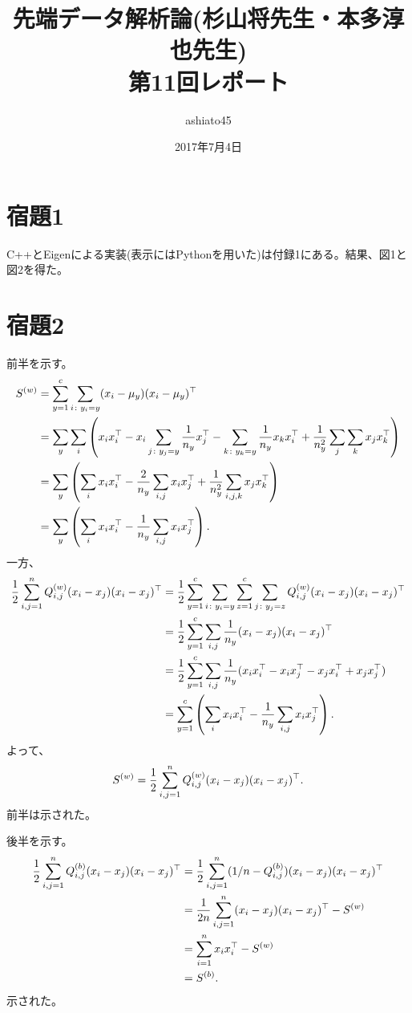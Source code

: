 \documentclass[9pt]{ltjsarticle}
\title{先端データ解析論(杉山将先生・本多淳也先生)\\第11回レポート}
\author{ashiato45}
\date{2017年7月4日}
\begin{document}
\maketitle

\section*{宿題1}
C++とEigenによる実装(表示にはPythonを用いた)は付録1にある。結果、図1と図2を得た。

\section*{宿題2}
前半を示す。
\begin{align}
S^{(w)} 
&=
\sum_{y=1}^c \sum_{i\colon y_i = y} (x_i - \mu_y)(x_i-\mu_y)^\top\\
&=
\sum_y \sum_i \left(x_ix_i^\top - x_i \sum_{j\colon y_j=y}\frac{1}{n_y}x_j^\top - \sum_{k\colon y_k=y}\frac{1}{n_y}x_kx_i^\top + \frac{1}{n_y^2}\sum_j\sum_k x_jx_k^\top \right) \\
&=
\sum_y \left(\sum_i x_ix_i^\top -\frac{2}{n_y}\sum_{i,j}x_ix_j^\top + \frac{1}{n_y^2}\sum_{i,j,k}x_jx_k^\top \right)\\
&=
\sum_y \left(\sum_i x_ix_i^\top - \frac{1}{n_y}\sum_{i,j}x_ix_j^\top\right).
\end{align}
一方、
\begin{align}
\frac{1}{2}\sum_{i,j=1}^n Q_{i,j}^{(w)}(x_i-x_j)(x_i-x_j)^\top
&=
\frac{1}{2}\sum_{y=1}^c\sum_{i\colon y_i=y}\sum_{z=1}^c \sum_{j\colon y_j=z} Q_{i,j}^{(w)}(x_i-x_j)(x_i-x_j)^\top\\
&=
\frac{1}{2}\sum_{y=1}^c \sum_{i,j}\frac{1}{n_y}(x_i-x_j)(x_i-x_j)^\top\\
&=
\frac{1}{2}\sum_{y=1}^c\sum_{i,j}\frac{1}{n_y}(x_ix_i^\top -x_ix_j^\top -x_jx_i^\top +x_jx_j^\top)\\
&=
\sum_{y=1}^c \left(\sum_i x_ix_i^\top - \frac{1}{n_y} \sum_{i,j}x_ix_j^\top\right).
\end{align}
よって、
\begin{align}
S^{(w)}  = \frac{1}{2}\sum_{i,j=1}^n Q_{i,j}^{(w)}(x_i-x_j)(x_i-x_j)^\top.
\end{align}
前半は示された。

後半を示す。
\begin{align}
\frac{1}{2}\sum_{i,j=1}^n Q_{i,j}^{(b)} (x_i-x_j)(x_i-x_j)^\top
&=
\frac{1}{2}\sum_{i,j=1}^n (1/n-Q_{i,j}^{(b)}) (x_i-x_j)(x_i-x_j)^\top\\
&=
\frac{1}{2n}\sum_{i,j=1}^n (x_i-x_j)(x_i-x_j)^\top - S^{(w)}\\
&=
\sum_{i=1}^n x_ix_i^\top - S^{(w)}\\
&=
S^{(b)}.
\end{align}
示された。
\end{document}
